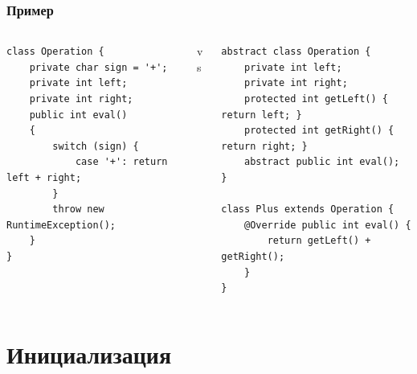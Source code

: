 \documentclass{../../slides-style}
\begin{document}
    \begin{frame}[fragile]
        \frametitle{Пример}
        \begin{footnotesize}
            \begin{columns}
                \begin{column}{0.35\textwidth}
                    \begin{verbatim}
class Operation {
    private char sign = '+';
    private int left;
    private int right;
    public int eval()
    {
        switch (sign) {
            case '+': return left + right;
        }
        throw new RuntimeException();
    }
}
                    \end{verbatim}
                \end{column}
                \begin{column}{0.1\textwidth}
                    vs
                \end{column}
                \begin{column}{0.55\textwidth}
                    \begin{verbatim}
abstract class Operation {
    private int left;
    private int right;
    protected int getLeft() { return left; }
    protected int getRight() { return right; }
    abstract public int eval();
}

class Plus extends Operation {
    @Override public int eval() { 
        return getLeft() + getRight(); 
    }
}
                    \end{verbatim}
                \end{column}
            \end{columns}
        \end{footnotesize}
    \end{frame}

    \section{Инициализация}
\end{document}
